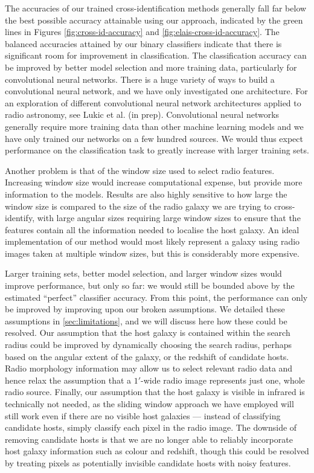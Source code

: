 \documentclass[fleqn,usenatbib,usedcolumn]{mnras}
\begin{document}
  The accuracies of our trained cross-identification methods generally fall
  far below the best possible accuracy attainable using our approach, indicated
  by the green lines in Figures \ref{fig:cross-id-accuracy} and
  \ref{fig:elais-cross-id-accuracy}. The balanced accuracies attained by our
  binary classifiers indicate that there is significant room for improvement
  in classification. The classification accuracy can be improved by better
  model selection and more training data, particularly for convolutional
  neural networks. There is a huge variety of ways to build a convolutional
  neural network, and we have only investigated one architecture. For an
  exploration of different convolutional neural network architectures
  applied to radio astronomy, see Lukic et al. (in prep). Convolutional
  neural networks generally require more training data than other machine
  learning models and we have only trained our networks on a few hundred
  sources. We would thus expect performance on the classification task to
  greatly increase with larger training sets.

  Another problem is that of the window size used to select radio features.
  Increasing window size would increase computational expense, but provide
  more information to the models. Results are also highly sensitive to how
  large the window size is compared to the size of the radio galaxy we are
  trying to cross-identify, with large angular sizes requiring large window
  sizes to ensure that the features contain all the information needed to
  localise the host galaxy. An ideal implementation of our method would most
  likely represent a galaxy using radio images taken at multiple window
  sizes, but this is considerably more expensive.

  Larger training sets, better model selection, and larger window sizes
  would improve performance, but only so far: we would still be bounded
  above by the estimated ``perfect'' classifier accuracy. From this point,
  the performance can only be improved by improving upon our broken
  assumptions. We detailed these assumptions in \autoref{sec:limitations},
  and we will discuss here how these could be resolved. Our assumption that the host galaxy is contained within the search radius could be improved by
  dynamically choosing the search radius, perhaps based on the angular
  extent of the galaxy, or the redshift of candidate hosts. Radio morphology information may allow us to select relevant radio data and hence relax the assumption that a $1'$-wide radio image represents just one, whole radio source. Finally, our
  assumption that the host galaxy is visible in infrared is technically not
  needed, as the sliding window approach we have employed will still work
  even if there are no visible host galaxies --- instead of classifying
  candidate hosts, simply classify each pixel in the radio image. The
  downside of removing candidate hosts is that we are no longer able to
  reliably incorporate host galaxy information such as colour and redshift,
  though this could be resolved by treating pixels as potentially invisible
  candidate hosts with noisy features.
\end{document}
